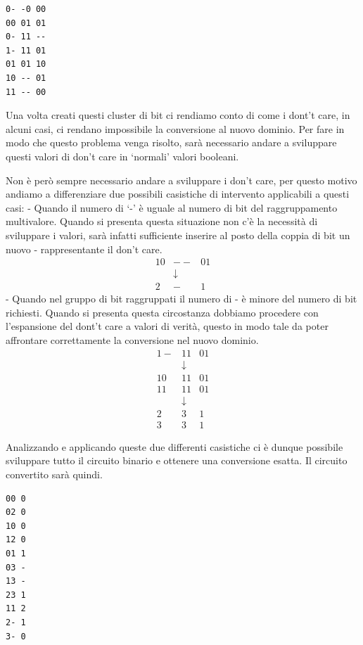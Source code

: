 \documentclass[
]{book}
\begin{document}
\begin{verbatim}
0- -0 00    
00 01 01
0- 11 --
1- 11 01
01 01 10
10 -- 01
11 -- 00
\end{verbatim}

Una volta creati questi cluster di bit ci rendiamo conto di come i dont't care, in alcuni casi, ci rendano impossibile la conversione al nuovo dominio. Per fare in modo che questo problema venga risolto, sarà necessario andare a sviluppare questi valori di don't care in `normali' valori booleani.

\newpage

Non è però sempre necessario andare a sviluppare i don't care, per questo motivo andiamo a differenziare due possibili casistiche di intervento applicabili a questi casi:
- Quando il numero di `-' è uguale al numero di bit del raggruppamento multivalore. Quando si presenta questa situazione non c'è la necessità di sviluppare i valori, sarà infatti sufficiente inserire al posto della coppia di bit un nuovo - rappresentante il don't care.
\[ \begin{array}{ccc}
        10 & -- & 01 \\ & \downarrow & \\ 2 & - & 1 
    \end{array}\]
- Quando nel gruppo di bit raggruppati il numero di - è minore del numero di bit richiesti. Quando si presenta questa circostanza dobbiamo procedere con l'espansione del dont't care a valori di verità, questo in modo tale da poter affrontare correttamente la conversione nel nuovo dominio.
\[ \begin{array}{cccc}
            1- & 11 & 01\\
            & \downarrow &\\
            10 & 11 & 01\\
            11 & 11 & 01\\
            & \downarrow &\\
            2 & 3 & 1\\
            3 & 3 & 1
        \end{array}\]

\newpage

Analizzando e applicando queste due differenti casistiche ci è dunque possibile sviluppare tutto il circuito binario e ottenere una conversione esatta. Il circuito convertito sarà quindi.

\begin{verbatim}
00 0
02 0
10 0
12 0
01 1
03 -
13 -
23 1
11 2
2- 1
3- 0
\end{verbatim}
\end{document}
